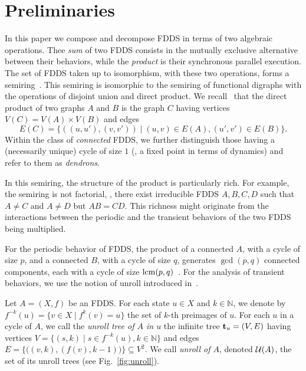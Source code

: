 \section{Preliminaries}
\label{sec:preliminaries}

In this paper we compose and decompose FDDS in terms of two algebraic operations.
Thee \emph{sum} of two FDDS 
consists in the mutually
exclusive alternative between their behaviors, while the \emph{product} is their synchronous parallel execution.
The set of FDDS taken up to isomorphism, with these two operations, forms a semiring~\cite{article_fondateur}.
This semiring is isomorphic to the semiring of functional digraphs with the operations of disjoint union and direct product.
We recall~\cite{livreGraphe} that the direct product of two graphs $A$ and $B$ is the graph $C$
having vertices $V(C) = V(A) \times V(B)$ and edges
\[
E(C) = \{((u,u'), (v,v')) \mid (u,v) \in E(A), (u',v') \in E(B)\}.
\]
Within the class of \emph{connected} FDDS, we further distinguish those having a (necessarily  unique) cycle of size $1$ (\ie, a fixed point in terms of dynamics) and refer to them as \emph{dendrons}. 

In this semiring, the structure of the product is particularly rich. 
For example, the semiring is not factorial, \ie, there exist irreducible FDDS $A,B,C,D$ such that $A \neq C$ and $A \neq D$ but $AB = CD$.
This richness might originate from the interactions between the periodic and the transient behaviors of the two FDDS being multiplied.


For the periodic behavior of FDDS, the product of a connected $A$, with a cycle of size $p$,
and a connected $B$, with a cycle of size $q$,
generates $\gcd(p,q)$ connected components, each with a cycle of size $\operatorname{lcm}(p,q)$~\cite{livreGraphe}.
For the analysis of transient behaviors, we use the notion of unroll introduced in~\cite{article_arbre}.

\begin{definition}[Unroll]
	Let $A = (X,f)$ be an FDDS.
	For each state $u\in X$ and $k \in \mathbb{N}$, we denote by $f^{-k}(u) = \{ v \in X \mid f^k(v) = u \}$ the set of $k$-th preimages of $u$. 
	For each $u$ in a cycle of $A$, we call the \emph{unroll tree of $A$ in $u$} the infinite tree $\tree{t}_u = (V,E)$ having vertices $V = \{(s,k) \mid s \in f^{-k}(u), k \in \mathbb{N}\}$ and edges
	$E = \big\{ \big((v,k),(f(v),k-1) \big) \big\} \subseteq V^2$.
	We call \emph{unroll of $A$}, denoted $\mathcal{U}(A)$, the set of its unroll trees (see Fig.~\ref{fig:unroll}).
\end{definition}


